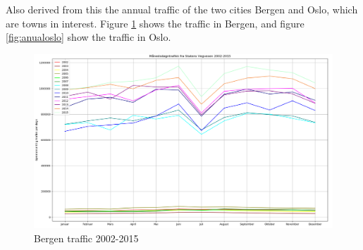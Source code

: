 \documentclass[11pt]{report}
\begin{document}
Also derived from this the annual traffic of the two cities Bergen and Oslo, which are towns in interest. Figure \ref{fig:anualbergen} shows the traffic in Bergen, and figure \ref{fig:anualoslo} show the traffic in Oslo.

\begin{figure}[ht]
\includegraphics[width=16cm]{xml_02_15_annual_bergen}
\centering
\caption{Bergen traffic 2002-2015}
\label{fig:anualbergen}
\end{figure}
\end{document}
